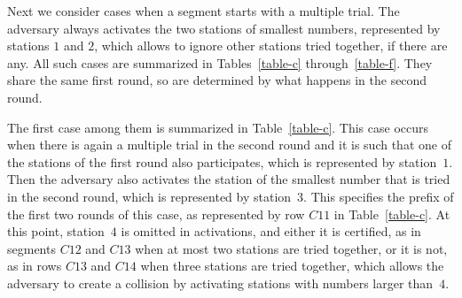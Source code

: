 \documentclass[11pt]{article}
\begin{document}
Next we consider cases when a segment starts with a multiple trial.
The adversary always activates the two stations of smallest numbers, represented by stations $1$ and $2$, which allows to ignore other stations tried together, if there are any.
All such cases are summarized in Tables~\ref{table-c} through~\ref{table-f}.
They share the same first round, so are determined by what happens in the second round.

The first case among them is summarized in Table~\ref{table-c}.
This case occurs when there is again a multiple trial in the second round and it is such that one of the stations of the first round also participates, which is represented by station~$1$.
Then the adversary also activates the station of the smallest number that is tried in the second round, which is represented by station~$3$.
This specifies the prefix of the first two rounds of this case, as represented by row $C11$ in Table~\ref{table-c}.
At this point, station~$4$ is omitted in activations, and either it is certified, as in segments $C12$ and $C13$ when at most two stations are tried together, or it is not, as in rows $C13$ and $C14$  when three stations are tried together, which allows the adversary to create a collision by activating stations with numbers larger than~$4$.
\end{document}
